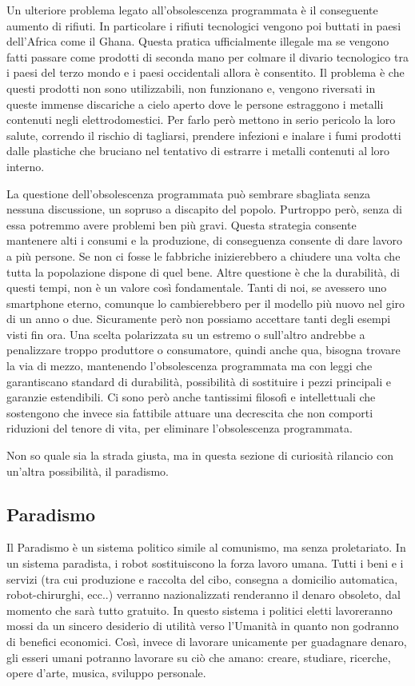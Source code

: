 \documentclass[12pt]{book} %
\begin{document}
Un ulteriore problema legato all'obsolescenza programmata è il conseguente aumento di rifiuti. In
particolare i rifiuti tecnologici vengono poi buttati in paesi dell'Africa come il Ghana. Questa
pratica ufficialmente illegale ma se vengono fatti passare come prodotti di seconda mano per colmare il divario
tecnologico tra i paesi del terzo mondo e i paesi occidentali allora è consentito. Il problema è che questi prodotti
non sono utilizzabili, non funzionano e, vengono riversati in queste immense discariche a cielo aperto dove le persone
estraggono i metalli contenuti negli elettrodomestici. Per farlo però mettono in serio pericolo la loro salute,
correndo il rischio di tagliarsi, prendere infezioni e inalare i fumi prodotti dalle plastiche che bruciano nel
tentativo di estrarre i metalli contenuti al loro interno.

La questione dell'obsolescenza programmata può sembrare sbagliata senza nessuna discussione, un
sopruso a discapito del popolo. Purtroppo però, senza di essa potremmo avere problemi ben più gravi. Questa strategia
consente mantenere alti i consumi e la produzione, di conseguenza consente di dare lavoro a più persone. Se non ci
fosse le fabbriche inizierebbero a chiudere una volta che tutta la popolazione dispone di quel bene. Altre questione è
che la durabilità, di questi tempi, non è un valore così fondamentale. Tanti di noi, se avessero uno smartphone eterno,
comunque lo cambierebbero per il modello più nuovo nel giro di un anno o due. Sicuramente però non possiamo accettare
tanti degli esempi visti fin ora. Una scelta polarizzata su un estremo o sull'altro andrebbe a
penalizzare troppo produttore o consumatore, quindi anche qua, bisogna trovare la via di mezzo, mantenendo
l'obsolescenza programmata ma con leggi che garantiscano standard di durabilità, possibilità di
sostituire i pezzi principali e garanzie estendibili. Ci sono però anche tantissimi filosofi e intellettuali che
sostengono che invece sia fattibile attuare una decrescita che non comporti riduzioni del tenore di vita, per eliminare
l'obsolescenza programmata. 

Non so quale sia la strada giusta, ma in questa sezione di curiosità rilancio con un'altra
possibilità, il paradismo.

\subsection{Paradismo}
Il Paradismo è un sistema politico simile al comunismo, ma senza proletariato. In un sistema paradista, i robot
sostituiscono la forza lavoro umana. Tutti i beni e i servizi (tra cui produzione e raccolta del cibo, consegna a
domicilio automatica, robot-chirurghi, ecc..) verranno nazionalizzati renderanno il denaro obsoleto, dal momento che
sarà tutto gratuito. In questo sistema i politici eletti lavoreranno mossi da un sincero desiderio di utilità verso
l'Umanità in quanto non godranno di benefici economici. Così, invece di lavorare unicamente per guadagnare denaro, gli
esseri umani potranno lavorare su ciò che amano: creare, studiare, ricerche, opere d'arte, musica, sviluppo
personale.
\end{document}
